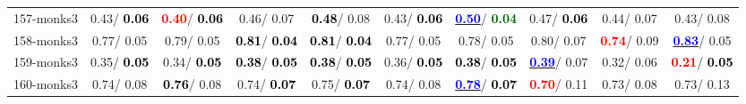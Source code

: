 \begin{table}[h]
\begin{center}
{\begin{tabular}{lc|c|c|c|c|c|c|c|c}
157-monks3 &   0.43/\textcolor{black}{\textbf{  0.06}} & \textcolor{red}{\textbf{  0.40}}/\textcolor{black}{\textbf{  0.06}} &   0.46/  0.07 & \textcolor{black}{\textbf{  0.48}}/  0.08 &   0.43/\textcolor{black}{\textbf{  0.06}} & \underline{\textcolor{blue}{\textbf{  0.50}}}/\textcolor{darkgreen}{\textbf{  0.04}} &   0.47/\textcolor{black}{\textbf{  0.06}} &   0.44/  0.07 &   0.43/  0.08 \\
158-monks3 &   0.77/  0.05 &   0.79/  0.05 & \textcolor{black}{\textbf{  0.81}}/\textcolor{black}{\textbf{  0.04}} & \textcolor{black}{\textbf{  0.81}}/\textcolor{black}{\textbf{  0.04}} &   0.77/  0.05 &   0.78/  0.05 &   0.80/  0.07 & \textcolor{red}{\textbf{  0.74}}/  0.09 & \underline{\textcolor{blue}{\textbf{  0.83}}}/  0.05 \\
159-monks3 &   0.35/\textcolor{black}{\textbf{  0.05}} &   0.34/\textcolor{black}{\textbf{  0.05}} & \textcolor{black}{\textbf{  0.38}}/\textcolor{black}{\textbf{  0.05}} & \textcolor{black}{\textbf{  0.38}}/\textcolor{black}{\textbf{  0.05}} &   0.36/\textcolor{black}{\textbf{  0.05}} & \textcolor{black}{\textbf{  0.38}}/\textcolor{black}{\textbf{  0.05}} & \underline{\textcolor{blue}{\textbf{  0.39}}}/  0.07 &   0.32/  0.06 & \textcolor{red}{\textbf{  0.21}}/\textcolor{black}{\textbf{  0.05}} \\
160-monks3 &   0.74/  0.08 & \textcolor{black}{\textbf{  0.76}}/  0.08 &   0.74/\textcolor{black}{\textbf{  0.07}} &   0.75/\textcolor{black}{\textbf{  0.07}} &   0.74/  0.08 & \underline{\textcolor{blue}{\textbf{  0.78}}}/\textcolor{black}{\textbf{  0.07}} & \textcolor{red}{\textbf{  0.70}}/  0.11 &   0.73/  0.08 &   0.73/  0.13 \\\end{tabular}}\label{stratsALCKappa4AllReduxhalfa}
\end{center}
\end{table}

